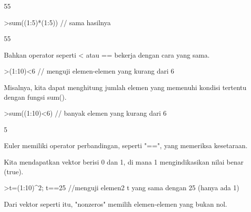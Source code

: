 \documentclass[12pt,arial,letterpaper]{book}
\begin{document}
\begin{eulercomment}
\begin{eulercomment}
\begin{eulerprompt}
\end{eulerprompt}
\begin{euleroutput}
  55
\end{euleroutput}
\begin{eulerprompt}
>sum((1:5)*(1:5)) // sama hasilnya
\end{eulerprompt}
\begin{euleroutput}
  55
\end{euleroutput}
\begin{eulercomment}
Bahkan operator seperti \textless{} atau == bekerja dengan cara yang sama.
\end{eulercomment}
\begin{eulerprompt}
>(1:10)<6 // menguji elemen-elemen yang kurang dari 6
\end{eulerprompt}
\begin{euleroutput}
  [1,  1,  1,  1,  1,  0,  0,  0,  0,  0]
\end{euleroutput}
\begin{eulercomment}
Misalnya, kita dapat menghitung jumlah elemen yang memenuhi kondisi
tertentu dengan fungsi sum().
\end{eulercomment}
\begin{eulerprompt}
>sum((1:10)<6) // banyak elemen yang kurang dari 6
\end{eulerprompt}
\begin{euleroutput}
  5
\end{euleroutput}
\begin{eulercomment}
Euler memiliki operator perbandingan, seperti "==", yang memeriksa
kesetaraan.

Kita mendapatkan vektor berisi 0 dan 1, di mana 1 mengindikasikan
nilai benar (true).
\end{eulercomment}
\begin{eulerprompt}
>t=(1:10)^2; t==25 //menguji elemen2 t yang sama dengan 25 (hanya ada 1)
\end{eulerprompt}
\begin{euleroutput}
  [0,  0,  0,  0,  1,  0,  0,  0,  0,  0]
\end{euleroutput}
\begin{eulercomment}
Dari vektor seperti itu, "nonzeros" memilih elemen-elemen yang bukan
nol.


\end{eulercomment}
\end{eulercomment}
\end{eulercomment}
\end{document}
